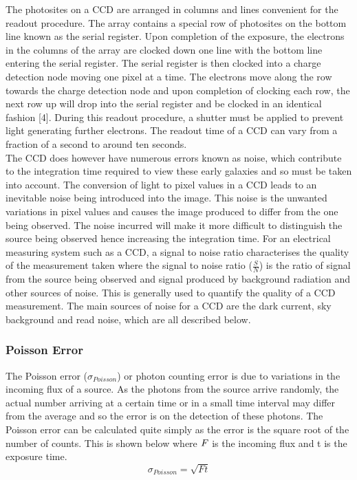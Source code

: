\documentclass[pdf,color]{UoBnote}
\begin{document}
\newline
The photosites on a CCD are arranged in columns and lines convenient for the readout procedure. The array contains a special row of photosites on the bottom line known as the serial register. Upon completion of the exposure, the electrons in the columns of the array are clocked down one line with the bottom line entering the serial register. The serial register is then clocked into a charge detection node moving one pixel at a time. The electrons move along the row towards the charge detection node and upon completion of clocking each row, the next row up will drop into the serial register and be clocked in an identical fashion [4]. During this readout procedure, a shutter must be applied to prevent light generating further electrons. The readout time of a CCD can vary from a fraction of a second to around ten seconds.\\
\newline
The CCD does however have numerous errors known as noise, which contribute to the integration time required to view these early galaxies and so must be taken into account. The conversion of light to pixel values in a CCD leads to an inevitable noise being introduced into the image. This noise is the unwanted variations in pixel values and causes the image produced to differ from the one being observed. The noise incurred will make it more difficult to distinguish the source being observed hence increasing the integration time. For an electrical measuring system such as a CCD, a signal to noise ratio characterises the quality of the measurement taken where the signal to noise ratio ($\frac{S}{N}$) is the ratio of signal from the source being observed and signal produced by background radiation and other sources of noise. This is generally used to quantify the quality of a CCD measurement. The main sources of noise for a CCD are the dark current, sky background and read noise, which are all described below.

\subsubsection{Poisson Error}
The Poisson error ($\sigma$$_{Poisson}$) or photon counting error is due to variations in the incoming flux of a source. As the photons from the source arrive randomly, the actual number arriving at a certain time or in a small time interval may differ from the average and so the error is on the detection of these photons. The Poisson error can be calculated quite simply as the error is the square root of the number of counts. This is shown below where $\it{F}$ is the incoming flux and t is the exposure time.\\
\begin{equation}
\sigma_{Poisson} = \sqrt{Ft}
\end{equation}
\end{document}
